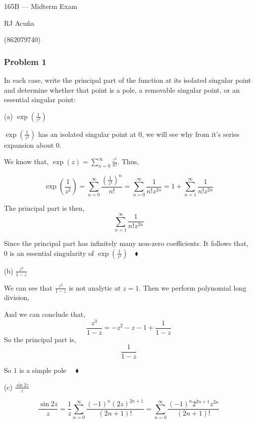 \documentclass{article}
\begin{document}
\begin{center}
  165B --- Midterm Exam

  RJ Acuña

  (862079740)
\end{center}\vspace{1.618em}

\subsubsection*{Problem 1} In each case, write the principal part of the function at its isolated singular point and determine
whether that point is a pole, a removable singular point, or an
essential singular point:

(a) $\exp\left(\frac{1}{z^2}\right)$


$\exp\left(\frac{1}{z^2}\right)$ has an isolated singular point at $0$, we will
see why from it's series expansion about $0$.

We know that, $\exp(z) = \sum_{n=0}^\infty \frac{z^n}{n!}$. Thus,

\[\exp\left(\frac{1}{z^2}\right) = \sum_{n=0}^\infty \frac{\left(
    \frac{1}{z^2}\right)^n}{n!} = \sum_{n=0}^\infty \frac{1}{n!z^{2n}}
=1 +\sum_{n=1}^\infty \frac{1}{n!z^{2n}}\]

The principal part is then, \[\sum_{n=1}^\infty \frac{1}{n!z^{2n}}\]

Since the principal part has infinitely many non-zero coefficients. It
follows that, $0$ is an essential singularity of
$\exp\left(\frac{1}{z^2}\right)\quad \blacklozenge$

(b) $\frac{z^3}{1-z}$

We can see that $\frac{z^3}{1-z}$ is not analytic at $z=1$. Then we
perform polynomial long division,

\begin{minipage}{.35\textwidth}
\end{minipage}
\begin{minipage}{.65\textwidth}
  And we can conclude that,
  \[\frac{z^3}{1-z} = -z^2-z-1 + \frac{1}{1-z}\]
  So the principal part is, \[\frac{1}{1-z}\]

  So $1$ is a simple pole $\quad \blacklozenge$
\end{minipage}

(c) $\frac{\sin 2z}{z}$



\[\frac{\sin 2z}{z} = \frac{1}{z}\sum_{n=0}^\infty
\frac{(-1)^n(2z)^{2n+1}}{(2n+1)!} = \sum_{n=0}^\infty
\frac{(-1)^n2^{2n+1}z^{2n}}{(2n+1)!}\]
\end{document}
